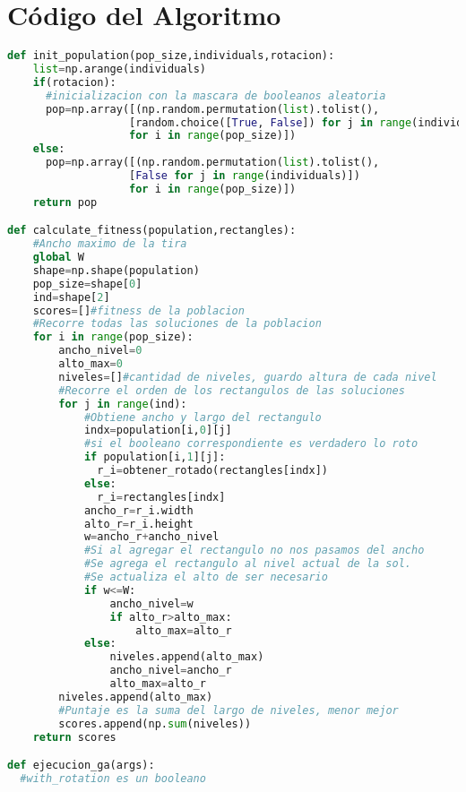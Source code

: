 \documentclass[10pt]{article}
\begin{document}
\section{Código del Algoritmo}
\begin{lstlisting}[language=Python]
def init_population(pop_size,individuals,rotacion):
    list=np.arange(individuals)
    if(rotacion):
      #inicializacion con la mascara de booleanos aleatoria
      pop=np.array([(np.random.permutation(list).tolist(),                      
                   [random.choice([True, False]) for j in range(individuals)]) 
                   for i in range(pop_size)])                                 
    else:
      pop=np.array([(np.random.permutation(list).tolist(),
      			   [False for j in range(individuals)]) 
      			   for i in range(pop_size)])
    return pop

def calculate_fitness(population,rectangles):
    #Ancho maximo de la tira
    global W
    shape=np.shape(population)
    pop_size=shape[0]
    ind=shape[2]
    scores=[]#fitness de la poblacion
    #Recorre todas las soluciones de la poblacion
    for i in range(pop_size):
        ancho_nivel=0
        alto_max=0
        niveles=[]#cantidad de niveles, guardo altura de cada nivel
        #Recorre el orden de los rectangulos de las soluciones
        for j in range(ind):
            #Obtiene ancho y largo del rectangulo
            indx=population[i,0][j]
            #si el booleano correspondiente es verdadero lo roto
            if population[i,1][j]: 
              r_i=obtener_rotado(rectangles[indx])
            else:
              r_i=rectangles[indx]
            ancho_r=r_i.width
            alto_r=r_i.height
            w=ancho_r+ancho_nivel
            #Si al agregar el rectangulo no nos pasamos del ancho
            #Se agrega el rectangulo al nivel actual de la sol.
            #Se actualiza el alto de ser necesario
            if w<=W:
                ancho_nivel=w
                if alto_r>alto_max:
                    alto_max=alto_r
            else:
                niveles.append(alto_max)
                ancho_nivel=ancho_r
                alto_max=alto_r
        niveles.append(alto_max)
        #Puntaje es la suma del largo de niveles, menor mejor
        scores.append(np.sum(niveles))
    return scores

def ejecucion_ga(args):
  #with_rotation es un booleano


\end{lstlisting}
\end{document}
